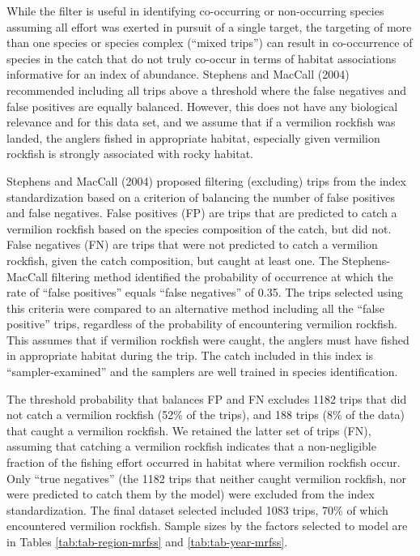 \documentclass[11pt,
  english,
]{article}
\begin{document}
While the filter is useful in identifying co-occurring or non-occurring species assuming all effort was exerted in pursuit of a single target, the targeting of more than one species or species complex (``mixed trips'') can result in co-occurrence of species in the catch that do not truly co-occur in terms of habitat associations informative for an index of abundance. Stephens and MacCall {(2004)\leavevmode\tagmcend\tagstructend} recommended including all trips above a threshold where the false negatives and false positives are equally balanced. However, this does not have any biological relevance and for this data set, and we assume that if a vermilion rockfish was landed, the anglers fished in appropriate habitat, especially given vermilion rockfish is strongly associated with rocky habitat.

Stephens and MacCall {(2004)\leavevmode\tagmcend\tagstructend} proposed filtering (excluding) trips from the index standardization based on a criterion of balancing the number of false positives and false negatives. False positives (FP) are trips that are predicted to catch a vermilion rockfish based on the species composition of the catch, but did not. False negatives (FN) are trips that were not predicted to catch a vermilion rockfish, given the catch composition, but caught at least one. The Stephens-MacCall filtering method identified the probability of occurrence at which the rate of ``false positives'' equals ``false negatives'' of 0.35. The trips selected using this criteria were compared to an alternative method including all the ``false positive'' trips, regardless of the probability of encountering vermilion rockfish. This assumes that if vermilion rockfish were caught, the anglers must have fished in appropriate habitat during the trip. The catch included in this index is ``sampler-examined'' and the samplers are well trained in species identification.

The threshold probability that balances FP and FN excludes 1182 trips that did not catch a vermilion rockfish (52\% of the trips), and 188 trips (8\% of the data) that caught a vermilion rockfish. We retained the latter set of trips (FN), assuming that catching a vermilion rockfish indicates that a non-negligible fraction of the fishing effort occurred in habitat where vermilion rockfish occur. Only ``true negatives'' (the 1182 trips that neither caught vermilion rockfish, nor were predicted to catch them by the model) were excluded from the index standardization. The final dataset selected included 1083 trips, 70\% of which encountered vermilion rockfish. Sample sizes by the factors selected to model are in Tables \ref{tab:tab-region-mrfss} and \ref{tab:tab-year-mrfss}.
\end{document}
